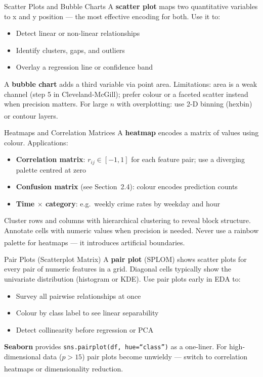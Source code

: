 \begin{v3topic}{Scatter Plots and Bubble Charts}
    A \textbf{scatter plot} maps two quantitative variables to x and y position ---
    the most effective encoding for both. Use it to:
    \begin{itemize}
        \item Detect linear or non-linear relationships
        \item Identify clusters, gaps, and outliers
        \item Overlay a regression line or confidence band
    \end{itemize}
    A \textbf{bubble chart} adds a third variable via point area. Limitations:
    area is a weak channel (step 5 in Cleveland-McGill); prefer colour or
    a faceted scatter instead when precision matters.
    For large $n$ with overplotting: use 2-D binning (hexbin) or contour
    layers\textsuperscript{\cite[][pp.~80--90]{brucePracticalStatisticsData2017}}.

\end{v3topic}
\begin{v3topic}{Heatmaps and Correlation Matrices}
    A \textbf{heatmap} encodes a matrix of values using colour. Applications:
    \begin{itemize}
        \item \textbf{Correlation matrix}: $r_{ij} \in [-1, 1]$ for each feature pair;
              use a diverging palette centred at zero
        \item \textbf{Confusion matrix} (see Section~2.4): colour encodes prediction counts
        \item \textbf{Time $\times$ category}: e.g.\ weekly crime rates by weekday and hour
    \end{itemize}
    Cluster rows and columns with hierarchical clustering to reveal block structure.
    Annotate cells with numeric values when precision is needed.
    Never use a rainbow palette for heatmaps --- it introduces artificial
    boundaries\textsuperscript{\cite[][pp.~148--160]{molinHandsonDataAnalysis2021}}.

\end{v3topic}
\begin{v3topic}{Pair Plots (Scatterplot Matrix)}
    A \textbf{pair plot} (SPLOM) shows scatter plots for every pair of numeric features in a
    grid. Diagonal cells typically show the univariate distribution (histogram or KDE).
    Use pair plots early in EDA to:
    \begin{itemize}
        \item Survey all pairwise relationships at once
        \item Colour by class label to see linear separability
        \item Detect collinearity before regression or PCA
    \end{itemize}
    \textbf{Seaborn} provides \texttt{sns.pairplot(df, hue=``class'')} as a one-liner.
    For high-dimensional data ($p > 15$) pair plots become unwieldy --- switch to
    correlation heatmaps or dimensionality
    reduction\textsuperscript{\cite[][pp.~161--165]{molinHandsonDataAnalysis2021}}.
\end{v3topic}

